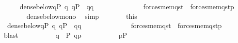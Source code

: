 \begin{isabellebody}
\ \ \ \ \isamarkupfalse%
\ {\isachardoublequoteopen}dense{\isacharunderscore}{\kern0pt}below{\isacharparenleft}{\kern0pt}{\isacharbraceleft}{\kern0pt}q{\isacharprime}{\kern0pt}{\isasymin}P{\isachardot}{\kern0pt}\ {\isasymforall}q{\isachardot}{\kern0pt}\ q{\isasymin}P\ {\isasymand}\ q{\isasympreceq}q{\isacharprime}{\kern0pt}\ {\isasymlongrightarrow}\ \isanewline
\ \ \ \ \ \ \ \ \ \ \ \ forces{\isacharunderscore}{\kern0pt}mem{\isacharparenleft}{\kern0pt}q{\isacharcomma}{\kern0pt}s{\isacharcomma}{\kern0pt}t{}{\isacharparenright}{\kern0pt}\ {\isasymlongleftrightarrow}\ forces{\isacharunderscore}{\kern0pt}mem{\isacharparenleft}{\kern0pt}q{\isacharcomma}{\kern0pt}s{\isacharcomma}{\kern0pt}t{}{\isacharparenright}{\kern0pt}{\isacharbraceright}{\kern0pt}{\isacharcomma}{\kern0pt}p{\isacharparenright}{\kern0pt}{\isachardoublequoteclose}\isanewline
\ \ \ \ \ \ \isamarkupfalse%
\ dense{\isacharunderscore}{\kern0pt}below{\isacharunderscore}{\kern0pt}mono\ \isamarkupfalse%
\ simp\isanewline
\ \ \ \ \isamarkupfalse%
\ \isamarkupfalse%
\ this\ \isanewline
\ \ \ \ \isamarkupfalse%
\ \ {\isachardoublequoteopen}dense{\isacharunderscore}{\kern0pt}below{\isacharparenleft}{\kern0pt}{\isacharbraceleft}{\kern0pt}q{\isacharprime}{\kern0pt}{\isasymin}P{\isachardot}{\kern0pt}\ {\isasymforall}q{\isachardot}{\kern0pt}\ q{\isasymin}P\ {\isasymand}\ q{\isasympreceq}q{\isacharprime}{\kern0pt}\ {\isasymlongrightarrow}\ \isanewline
\ \ \ \ \ \ \ \ \ \ \ \ forces{\isacharunderscore}{\kern0pt}mem{\isacharparenleft}{\kern0pt}q{\isacharcomma}{\kern0pt}s{\isacharcomma}{\kern0pt}t{}{\isacharparenright}{\kern0pt}\ {\isasymlongleftrightarrow}\ forces{\isacharunderscore}{\kern0pt}mem{\isacharparenleft}{\kern0pt}q{\isacharcomma}{\kern0pt}s{\isacharcomma}{\kern0pt}t{}{\isacharparenright}{\kern0pt}{\isacharbraceright}{\kern0pt}{\isacharcomma}{\kern0pt}p{\isacharparenright}{\kern0pt}{\isachardoublequoteclose}\isanewline
\ \ \ \ \ \ \isamarkupfalse%
\ blast\isanewline
\ \ \ \ \isamarkupfalse%
\isanewline
\ \ \ \ \isamarkupfalse%
\ {\isachardoublequoteopen}q\ {\isasymin}\ P{\isachardoublequoteclose}\ {\isachardoublequoteopen}q{\isasympreceq}p{\isachardoublequoteclose}\isanewline
\ \ \ \ \isamarkupfalse%
\isanewline
\ \ \ \ \isamarkupfalse%
\ {\isacartoucheopen}p{\isasymin}P{\isacartoucheclose}\isanewline
\ \ \ \ \isamarkupfalse%
\ \isanewline

\end{isabellebody}
